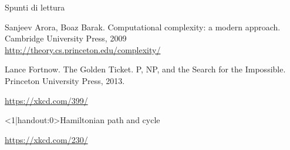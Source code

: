 \begin{frame}{Spunti di lettura}

\vspace{-9pt}
\begin{block}{}
Sanjeev Arora, Boaz Barak. Computational complexity: a modern approach.
Cambridge University Press, 2009\\
\url{http://theory.cs.princeton.edu/complexity/}
\end{block}
\begin{block}{}
Lance Fortnow. The Golden Ticket. P, NP, and the Search for the Impossible. Princeton University Press, 2013.
\end{block}


\vfill
\tiny
\url{https://xkcd.com/399/}

\end{frame}

\begin{frame}<1|handout:0>{Hamiltonian path and cycle}
\vspace{-12pt}
\begin{center}
\end{center}
\vfill
\tiny
\url{https://xkcd.com/230/}
\end{frame}












